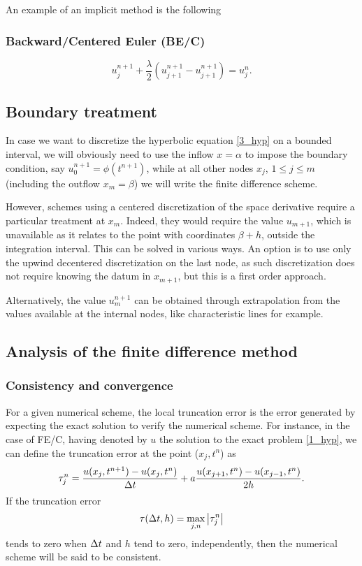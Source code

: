 An example of an implicit method is the following
\subsubsection*{Backward/Centered Euler (BE/C)}
\begin{equation}
    u_j^{n+1} + \frac{\lambda}{2} (u^{n+1}_{j+1} - u^{n+1}_{j+1}) = u^n_j.
    \label{13_hyp}
\end{equation}
\subsection{Boundary treatment}
In case we want to discretize the hyperbolic equation \eqref{3_hyp} on a bounded interval, we will obviously need to use the inflow \(x=\alpha\) to impose the boundary condition, say \(u^{n+1}_0 = \phi(t^{n+1})\), while at all other nodes \(x_j\), \(1\leq j \leq m\) (including the outflow \(x_m = \beta\)) we will write the finite difference scheme. 

However, schemes using a centered discretization of the space derivative require a particular treatment at \(x_m\). Indeed, they would require the value \(u_{m+1}\), which is unavailable as it relates to the point with coordinates \(\beta + h\), outside the integration interval. This can be solved in various ways. An option is to use only the upwind decentered discretization on the last node, as such discretization does not require knowing the datum in \(x_{m+1}\), but this is a first order approach.

Alternatively, the value \(u_m^{n+1}\) can be obtained through extrapolation from the values available at the internal nodes, like characteristic lines for example. 
\subsection{Analysis of the finite difference method}
\subsubsection*{Consistency and convergence}
For a given numerical scheme, the local truncation error is the error generated by expecting the exact solution to verify the numerical scheme. For instance, in the case of FE/C, having denoted by \(u\) the solution to the exact problem \eqref{1_hyp}, we can define the truncation error at the point (\(x_j, t^n\)) as 
\[
    \tau_j^n = \frac{u(x_j,t^{n+1}) - u(x_j, t^n)}{\Delta t} + a\frac{u(x_{j+1}, t^n)- u(x_{j-1}, t^n)}{2h}.
\]
If the truncation error 
\[
    \tau(\Delta t, h) = \max_{j,n}\abs{\tau_j^n}
\]
tends to zero when \(\Delta t\) and \(h\) tend to zero, independently, then the numerical scheme will be said to be consistent.

